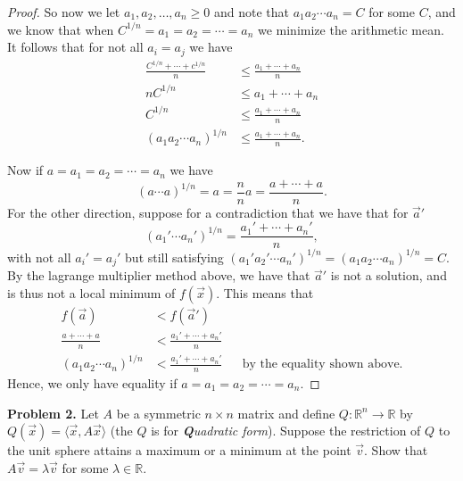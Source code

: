 \documentclass[leqno]{article}
\theoremstyle{nonumberplain}
\newtheorem{proof}{Proof}
\newcommand{\R}{\mathbb{R}}
\begin{document}
\begin{proof}
So now we let $a_1,a_2,\dots,a_n\geq 0$ and note that $a_1 a_2 \cdots a_n = C$ for some $C$, and we know that when $C^{1/n}=a_1=a_2=\cdots=a_n$ we minimize the arithmetic mean. It follows that for not all $a_i=a_j$ we have
\begin{align*}
\frac{C^{1/n}+\cdots+c^{1/n}}{n}&\leq \frac{a_1+\cdots+a_n}{n}\\
nC^{1/n}&\leq a_1+\cdots + a_n\\
C^{1/n}&\leq \frac{a_1+\cdots + a_n}{n}\\
(a_1 a_2 \cdots a_n)^{1/n} &\leq \frac{a_1+\cdots + a_n}{n}.
\end{align*}

Now if $a=a_1=a_2=\cdots =a_n$ we have
\[
(a\cdots a)^{1/n}=a=\frac{n}{n}a=\frac{a+\cdots +a}{n}.
\]
For the other direction, suppose for a contradiction that we have that for $\vec{a}'$
\[
(a_1'\cdots a_n')^{1/n}=\frac{a_1'+\cdots + a_n'}{n},
\]
with not all $a_i'=a_j'$ but still satisfying $(a_1' a_2' \cdots a_n')^{1/n}=(a_1 a_2 \cdots a_n)^{1/n}=C$.  By the lagrange multiplier method above, we have that $\vec{a}'$ is not a solution, and is thus not a local minimum of $f(\vec{x})$. This means that
\begin{align*}
f(\vec{a})&<f(\vec{a}')\\
\frac{a+\cdots +a}{n} &< \frac{a_1'+\cdots + a_n'}{n}\\
(a_1 a_2 \cdots a_n)^{1/n} &< \frac{a_1'+\cdots + a_n'}{n} && \textrm{by the equality shown above}.
\end{align*}
Hence, we only have equality if $a=a_1=a_2=\cdots =a_n$.
\end{proof}



\pagebreak



\noindent\textbf{Problem 2. } Let $A$ be a symmetric $n\times n$ matrix and define $Q\colon \R^n \to \R$ by $Q(\vec{x})=\langle \vec{x},A\vec{x} \rangle$ (the $Q$ is for \emph{\textbf{Q}uadratic form}). Suppose the restriction of $Q$ to the unit sphere attains a maximum or a minimum at the point $\vec{v}$. Show that $A\vec{v}=\lambda \vec{v}$ for some $\lambda \in \R$.
\end{document}
